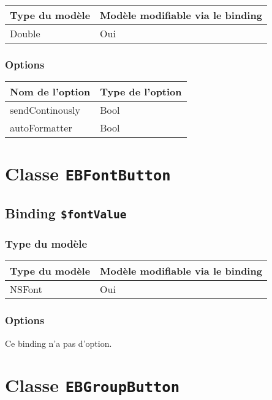 \begin{tabular}{|l|l|}
\hline
\textbf{Type du modèle} & \textbf{Modèle modifiable via le binding}\\
\hline
Double & Oui\\
\hline
\end{tabular}
\subsubsection{Options}

\begin{tabular}{|l|l|}
\hline
\textbf{Nom de l'option} & \textbf{Type de l'option}\\
\hline
sendContinously & Bool\\
\hline
autoFormatter & Bool\\
\hline
\end{tabular}







\section{Classe \texttt{EBFontButton}}

\subsection{Binding \texttt{\$fontValue}}

\subsubsection{Type du modèle}

\begin{tabular}{|l|l|}
\hline
\textbf{Type du modèle} & \textbf{Modèle modifiable via le binding}\\
\hline
NSFont & Oui\\
\hline
\end{tabular}
\subsubsection{Options}

Ce binding n'a pas d'option.








\section{Classe \texttt{EBGroupButton}}

